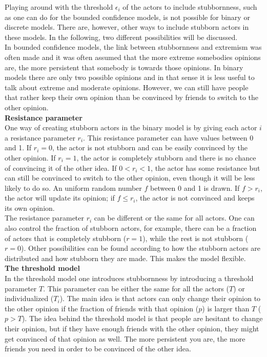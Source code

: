 \documentclass[11 pt , letterpaper , twoside , openright]{book}
\begin{document}
Playing around with the threshold $\epsilon_i$ of the actors to include stubbornness, such as one can do for the bounded confidence models, is not possible for binary or discrete models. There are, however, other ways to include stubborn actors in these models. In the following, two different possibilities will be discussed. \\
\newline
In bounded confidence models, the link between stubbornness and extremism was often made and it was often assumed that the more extreme somebodies opinions are, the more persistent that somebody is towards those opinions. In binary models there are only two possible opinions and in that sense it is less useful to talk about extreme and moderate opinions. However, we can still have people that rather keep their own opinion than be convinced by friends to switch to the other opinion.\\
\newline
\textbf{Resistance parameter}\\
\newline
One way of creating stubborn actors in the binary model is by giving each actor $i$ a resistance parameter $r_i$. This resistance parameter can have values between 0 and 1. If $r_i = 0$, the actor is not stubborn and can be easily convinced by the other opinion. If $r_i = 1$, the actor is completely stubborn and there is no chance of convincing it of the other idea. If $0 < r_i < 1$, the actor has some resistance but can still be convinced to switch to the other opinion, even though it will be less likely to do so. An uniform random number $f$ between 0 and 1 is drawn. If $f > r_i$, the actor will update its opinion; if $f \leqslant r_i$, the actor is not convinced and keeps its own opinion.\\
\newline
The resistance parameter $r_i$ can be different or the same for all actors. One can also control the fraction of stubborn actors, for example, there can be a fraction of actors that is completely stubborn ($r = 1$), while the rest is not stubborn ($r = 0$). Other possibilities can be found according to how the stubborn actors are distributed and how stubborn they are made. This makes the model flexible.\\
\newline
\textbf{The threshold model}\\
\newline
In the threshold model one introduces stubbornness by introducing a threshold parameter $T$. This parameter can be either the same for all the actors ($T$) or individualized ($T_i$). The main idea is that actors can only change their opinion to the other opinion if the fraction of friends with that opinion ($p$) is larger than $T$ ($p > T$). The idea behind the threshold model is that people are hesitant to change their opinion, but if they have enough friends with the other opinion, they might get convinced of that opinion as well. The more persistent you are, the more friends you need in order to be convinced of the other idea. \\
\end{document}
